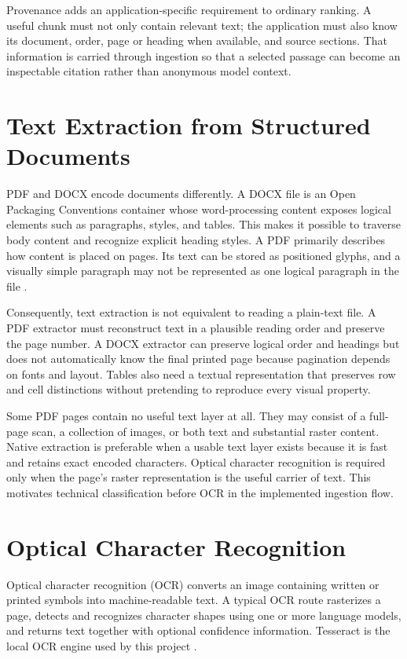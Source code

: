 Provenance adds an application-specific requirement to ordinary ranking. A useful chunk must not only contain relevant text; the application must also know its document, order, page or heading when available, and source sections. That information is carried through ingestion so that a selected passage can become an inspectable citation rather than anonymous model context.

\section{Text Extraction from Structured Documents}
\label{sec:background-extraction}

PDF and DOCX encode documents differently. A DOCX file is an Open Packaging Conventions container whose word-processing content exposes logical elements such as paragraphs, styles, and tables. This makes it possible to traverse body content and recognize explicit heading styles. A PDF primarily describes how content is placed on pages. Its text can be stored as positioned glyphs, and a visually simple paragraph may not be represented as one logical paragraph in the file \cite{ECMA376,ISO32000PDF}.

Consequently, text extraction is not equivalent to reading a plain-text file. A PDF extractor must reconstruct text in a plausible reading order and preserve the page number. A DOCX extractor can preserve logical order and headings but does not automatically know the final printed page because pagination depends on fonts and layout. Tables also need a textual representation that preserves row and cell distinctions without pretending to reproduce every visual property.

Some PDF pages contain no useful text layer at all. They may consist of a full-page scan, a collection of images, or both text and substantial raster content. Native extraction is preferable when a usable text layer exists because it is fast and retains exact encoded characters. Optical character recognition is required only when the page's raster representation is the useful carrier of text. This motivates technical classification before OCR in the implemented ingestion flow.

\section{Optical Character Recognition}
\label{sec:background-ocr}

Optical character recognition (OCR) converts an image containing written or printed symbols into machine-readable text. A typical OCR route rasterizes a page, detects and recognizes character shapes using one or more language models, and returns text together with optional confidence information. Tesseract is the local OCR engine used by this project \cite{Smith2007Tesseract,TesseractDocs}.

